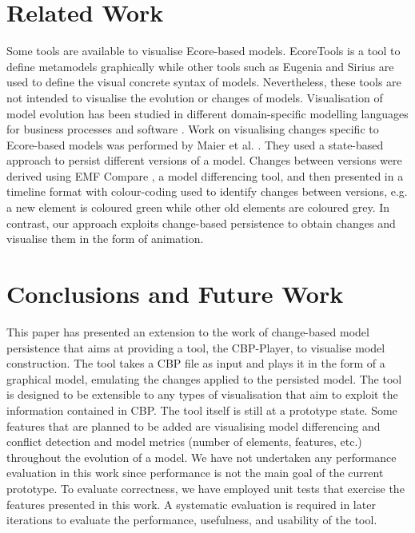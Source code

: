 \documentclass[conference]{IEEEtran}
\begin{document}
\section{Related Work}
\label{sec:related_work}
Some tools are available to visualise Ecore-based models. 
EcoreTools \cite{eclipse2019ecoretools} is a tool to define metamodels graphically while other tools such as
Eugenia \cite{Kolovos2017} and Sirius \cite{eclipse2019sirius} are used 
to define the visual concrete syntax of models.
Nevertheless, these tools are not intended to visualise the evolution or changes of models. 
Visualisation of model evolution has been studied in different domain-specific
modelling languages for business processes \cite{fritscher2014visualizing}
and software \cite{Mattila:2016:SVT:2994310.2994327}. Work on visualising changes specific to Ecore-based models 
was performed by Maier et al. \cite{maier2015recording}. 
They used a state-based approach to persist different versions of a model.
Changes between versions were derived using EMF Compare \cite{eclipse2017compare}, 
a model differencing tool, and then presented 
in a timeline format with colour-coding used 
to identify changes between versions, e.g. a new element is coloured green
while other old elements are coloured grey. In contrast, our approach
exploits change-based persistence to obtain changes and visualise them in
the form of animation.

\section{Conclusions and Future Work}
\label{sec:conclusions_and_future_work}
This paper has presented an extension to the work of change-based model persistence
that aims at providing a tool, the CBP-Player, to visualise model construction. 
The tool takes a CBP file as input and plays it in the form of a graphical model,
emulating the changes applied to the persisted model. 
The tool is designed to be extensible to any types of visualisation that aim
to exploit the information contained in CBP. The tool itself is still at a prototype state. 
Some features that are planned to be added are visualising model differencing
and conflict detection and model metrics 
(number of elements, features, etc.) throughout the evolution of a model. We have not undertaken any performance evaluation in this work 
since performance is not the main goal of the current prototype.
To evaluate correctness, we have employed unit tests that exercise the features 
presented in this work. A systematic evaluation is required in later iterations 
to evaluate the performance, usefulness, and usability of the tool.
\end{document}
